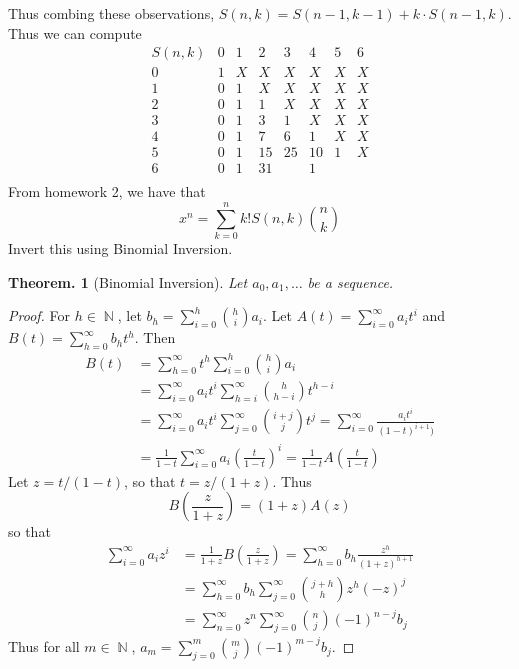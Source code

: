 \documentclass[11pt, a4paper]{memoir}
\DeclareMathOperator{\N}{{\mathbb{N}}}
\theoremstyle{change}
\newtheorem{theorem}{Theorem.}[section]
\theoremstyle{plain}
\theoremstyle{nonumberplain}
\newtheorem{proof}{Proof}
\numberwithin{equation}{section}
\begin{document}
Thus combing these observations, $S(n,k)=S(n-1,k-1)+k\cdot S(n-1,k)$.
Thus we can compute
\begin{equation*}
    \begin{array}{c|c|c|c|c|c|c|c}
        S(n,k) & 0 & 1 & 2 & 3 & 4 & 5 & 6\\
        \hline
        0 & 1 & X & X & X & X & X & X\\
        \hline
        1 & 0 & 1 & X & X & X & X & X\\
        \hline
        2 & 0 & 1 & 1 & X & X & X & X\\
        \hline
        3 & 0 & 1 & 3 & 1 & X & X & X\\
        \hline
        4 & 0 & 1 & 7 & 6 & 1 & X & X\\
        \hline
        5 & 0 & 1 & 15& 25& 10& 1 & X\\
        \hline
        6 & 0 & 1 & 31&  & 1\\
    \end{array}
\end{equation*}
From homework 2, we have that
\begin{equation*}
    x^n=\sum_{k=0}^n k! S(n,k)\binom{n}{k}
\end{equation*}
Invert this using Binomial Inversion.
\begin{theorem}[Binomial Inversion]
Let $a_0,a_1,\ldots$ be a sequence.
\end{theorem}
\begin{proof}
    For $h\in\N$, let $b_h=\sum_{i=0}^h\binom{h}{i}a_i$.
    Let $A(t)=\sum_{i=0}^\infty a_it^i$ and $B(t)=\sum_{h=0}^\infty b_ht^h$.
    Then
    \begin{align*}
        B(t) &= \sum_{h=0}^\infty t^h\sum_{i=0}^h\binom{h}{i}a_i\\
             &= \sum_{i=0}^\infty a_it^i\sum_{h=i}^\infty\binom{h}{h-i}t^{h-i}\\
             &= \sum_{i=0}^\infty a_it^i\sum_{j=0}^\infty\binom{i+j}{j}t^j=\sum_{i=0}^\infty\frac{a_it^i}{(1-t)^{i+1})}\\
             &= \frac{1}{1-t}\sum_{i=0}^\infty a_i\left(\frac{t}{1-t}\right)^i=\frac{1}{1-t}A\left(\frac{t}{1-t}\right)
    \end{align*}
    Let $z=t/(1-t)$, so that $t=z/(1+z)$.
    Thus
    \begin{equation*}
        B\left(\frac{z}{1+z}\right)=(1+z)A(z)
    \end{equation*}
    so that
    \begin{align*}
        \sum_{i=0}^\infty a_iz^i &= \frac{1}{1+z}B\left(\frac{z}{1+z}\right) = \sum_{h=0}^\infty b_h\frac{z^h}{(1+z)^{h+1}}\\
                                &= \sum_{h=0}^\infty b_h\sum_{j=0}^\infty\binom{j+h}{h}z^{h}(-z)^j\\
                                &= \sum_{n=0}^\infty z^n\sum_{j=0}^\infty\binom{n}{j}(-1)^{n-j}b_{j}
    \end{align*}
    Thus for all $m\in\N$, $a_m=\sum_{j=0}^m\binom{m}{j}(-1)^{m-j}b_j$.
\end{proof}
\end{document}
